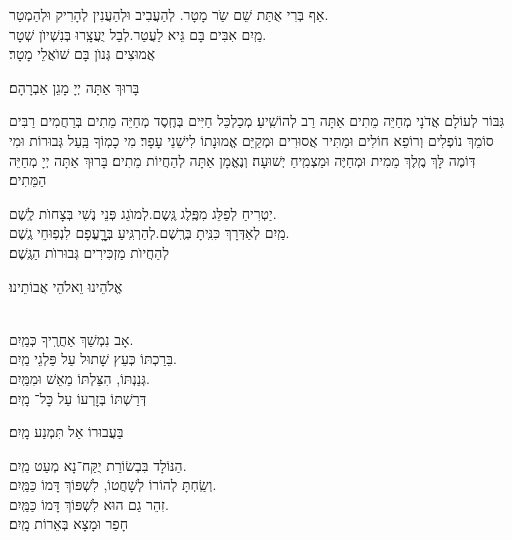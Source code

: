 \documentclass[twoside, openany, parskip=half, 11pt]{book}
\begin{document}
אַף בְּרִי אֻתַּת שֵׁם שַֹר מָטָר. \hfill לְהַעֲבִיב וּלְהַעֲנִין לְהָרִיק וּלְהַמְטַר.\\
מַֽיִם אִבִּים בָּם גֵּיא לַעֲטַר.\hfill לְבַל יֻעֲצָֽרוּ בְּנִשְׁיוׂן שְׁטָר.\\
אֲמוּצִים גְּנוׂן בָּם שׁוׂאֲלֵי מָטָר׃



בָּרוּךְ אַתָּה יְיָ מָגֵן אַבְרָהָם׃

גִּבּוֹר לְעוֹלָם אֲדֹנָי מְחַיֵּה מֵתִים אַתָּה רַב לְהוֹשִֽׁיעַ׃ מְכַלְכֵּל חַיִּים בְּחֶֽסֶד מְחַיֵּה מֵתִים בְּרַחֲמִים רַבִּים סוֹמֵךְ נוֹפְלִים וְרוֹפֵא חוֹלִים וּמַתִּיר אֲסוּרִים וּמְקַיֵּם אֱמוּנָתוֹ לִישֵׁנֵי עָפָר׃ מִי כָמֽוֹךָ בַּֽעַל גְּבוּרוֹת וּמִי דּֽוֹמֶה לָּךְ מֶֽלֶךְ מֵמִית וּמְחַיֶּה וּמַצְמִֽיחַ יְשׁוּעָה׃ וְנֶאֱמָן אַתָּה לְהַחֲיוֹת מֵתִים׃ בָּרוּךְ אַתָּה יְיָ מְחַיֵּה הַמֵּתִים׃





יַטְרִיחַ לְפַלֵּג מִפֶּֽלֶג גֶּֽשֶם.\hfill לְמוׂגֵג פְּנֵי נֶשִׁי בְּצָחוׂת לֶֽשֶׁם.\\
מַֽיִם לְאַדְּרָךְ כִּנִּֽיתָ בְּרֶֽשֶׁם.\hfill לְהַרְגִּֽיעַ בְּרׇׇׇׇׇעֳפָם לִנְפֽוּחֵי גֶֽשֶׁם.\\
לְהַחֲיוׂת מַזְכִּירִים גְּבוּרוׂת הַגֶּֽשֶׁם׃


\begin{small}אֱלֹהֵינוּ וֵאלֹהֵי אֲבוֹתֵינוּ׃\end{small}\\

 אָב נִמְשַׁךְ אַחֲרֶֽיךָ \hfill כְּמַֽיִם.\\
בֵּרַכְתּוֹ כְּעֵץ שָׁתוּל עַל פַּלְגֵי \hfill מַֽיִם.\\
גְּנַנְתּוֹ, הִצַּלְתּוֹ מֵאֵשׁ \hfill וּמִמַּֽיִם.\\
דְּרַשְׁתּוֹ בְּזׇרְעוֹ עַל כׇּל־ \hfill מָֽיִם׃

\kahal
 בַּעֲבוּרוֹ אַל תִּמְנַע מָֽיִם׃

 הַנּוֹלָד בִּבְשׂוֹרַת יֻקַּח־נָא מְעַט \hfill מַֽיִם.\\
וְשַֽׂחְתָּ לְהוֹרוֹ לְשָׁחֲטוֹ, לִשְׁפּוֹךְ דָּמוֹ \hfill כַּמַּֽיִם.\\
זִהֵר גַם הוּא לִשְׁפּוֹךְ דָּמוֹ \hfill כַּמַּֽיִם.\\
חָפַר וּמָצָא בְּאֵרוֹת \hfill מָֽיִם׃
\end{document}
